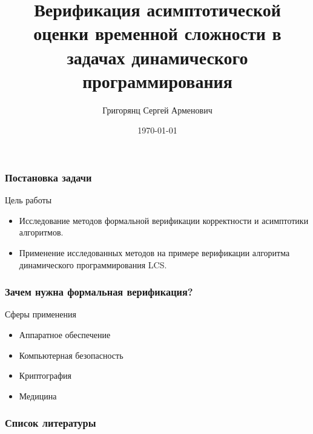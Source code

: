 \documentclass{beamer}
\title[]{Верификация асимптотической оценки временной сложности в задачах динамического программирования} %
\author{Григорянц Сергей Арменович} %
\institute[] %
{Московский физико-технический институт \\
Физтех-школа Прикладной Математики и Информатики \\
Кафедра дискретной математики\\ %
Научный руководитель: Дашков Евгений Владимирович
}
\date{\today} %
\begin{document}
\begin{frame}
	\titlepage
\end{frame}

\begin{frame}
	\frametitle{Постановка задачи}
	\begin{block}{Цель работы}
		\begin{itemize}
			\item<2-> Исследование методов формальной верификации корректности и асимптотики алгоритмов.
			\item<3-> Применение исследованных методов на примере верификации алгоритма динамического программирования LCS.
		\end{itemize}
	\end{block}
\end{frame}

\begin{frame}
	\frametitle{Зачем нужна формальная верификация?}
	\begin{block}{Сферы применения}
		\begin{itemize}
			\item<2-> Аппаратное обеспечение \cite{intel}
			\item<2-> Компьютерная безопасность
			\item<3-> Криптография
			\item<4-> Медицина
		\end{itemize}
	\end{block}
\end{frame}

\begin{frame}[shrink=30]
	\frametitle{Список литературы}
	\printbibliography
\end{frame}

\end{document}
